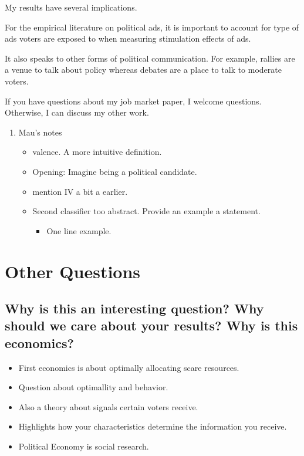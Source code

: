 \documentclass[12pt]{article}
\theoremstyle{plain}
\theoremstyle{plain}
\theoremstyle{plain}
\theoremstyle{plain}
\theoremstyle{plain}
\theoremstyle{plain}
\begin{document}
My results have several implications.

For the empirical literature on political ads, it is important to account for type of ads voters are exposed to when measuring stimulation effects of ads.

It also speaks to other forms of political communication.
For example, rallies are a venue to talk about policy whereas debates are a place to talk to moderate voters.


If you have questions about my job market paper, I welcome questions.
Otherwise, I can discuss my other work.

\clearpage

\begin{enumerate}
\item Mau's notes
\label{sec:org79b57fa}
\begin{itemize}
\item valence. A more intuitive definition.
\item Opening: Imagine being a political candidate.
\item mention IV a bit a earlier.
\item Second classifier too abstract. Provide an example a statement.
\begin{itemize}
\item One line example.
\end{itemize}
\end{itemize}

\clearpage
\end{enumerate}


\section{Other Questions}
\label{sec:org53a3f69}
\subsection{Why is this an interesting question? Why should we care about your results? Why is this economics?}
\label{sec:org66b3d62}
\begin{itemize}
\item First economics is about optimally allocating scare resources.
\item Question about optimallity and behavior.
\item Also a theory about signals certain voters receive.
\item Highlights how your characteristics determine the information you receive.
\item Political Economy is social research.
\end{itemize}
\end{document}
